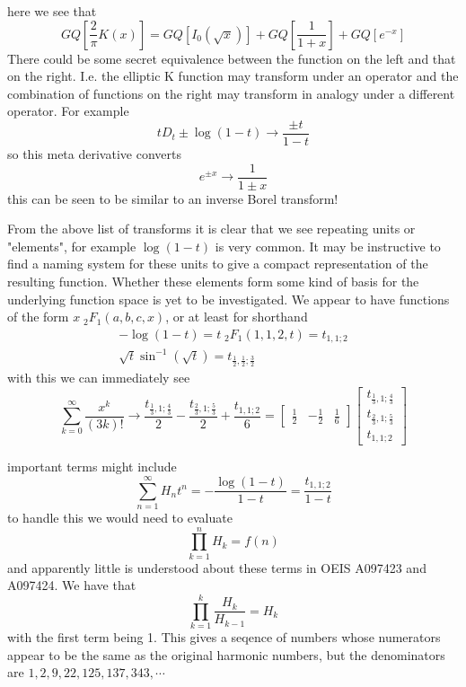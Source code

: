 \documentclass{article}
\begin{document}
here we see that
$$
GQ\left[ \frac{2}{\pi} K(x)\right] = GQ\left[I_0(\sqrt{x})\right] + GQ\left[\frac{1}{1+x}\right] + G Q[e^{-x}]
$$
There could be some secret equivalence between the function on the left and that on the right. I.e. the elliptic K function may transform under an operator and the combination of functions on the right may transform in analogy under a different operator. For example
$$
tD_t \pm \log(1-t) \to \frac{\pm t}{1-t}
$$
so this meta derivative converts 
$$
e^{\pm x} \to \frac{1}{1\pm x}
$$
this can be seen to be similar to an inverse Borel transform!

From the above list of transforms it is clear that we see repeating units or "elements", for example $\log(1-t)$ is very common. It may be instructive to find a naming system for these units to give a compact representation of the resulting function. Whether these elements form some kind of basis for the underlying function space is yet to be investigated. We appear to have functions of the form $x \;_2F_1(a,b,c,x)$, or at least for shorthand
\begin{align}
-\log(1-t) = t\;_2F_1(1,1,2,t) = t_{1,1;2} \\
\sqrt{t} \sin^{-1}(\sqrt{t}) = t_{\frac{1}{2},\frac{1}{2};\frac{3}{2}}
\end{align}
with this we can immediately see 
$$
\sum_{k=0}^\infty \frac{x^k}{(3k)!} \to  \frac{t_{\frac{1}{3},1;\frac{4}{3}}}{2}-\frac{t_{\frac{2}{3},1;\frac{5}{3}}}{2}+\frac{t_{1,1;2}}{6} = 
\begin{bmatrix} \frac{1}{2} & -\frac{1}{2} & \frac{1}{6} \end{bmatrix} 
\begin{bmatrix} t_{\frac{1}{3},1;\frac{4}{3}} \\ t_{\frac{2}{3},1;\frac{5}{3}} \\ t_{1,1;2} \end{bmatrix}
$$

important terms might include
$$
\sum_{n=1}^\infty H_n t^n = -\frac{\log(1-t)}{1-t} = \frac{t_{1,1;2}}{1-t}
$$
to handle this we would need to evaluate 
$$
\prod_{k=1}^n H_k = f(n)
$$
and apparently little is understood about these terms in OEIS A097423 and A097424.
We have that 
$$
\prod_{k=1}^k \frac{H_k}{H_{k-1}} = H_k
$$
with the first term being 1. This gives a seqence of numbers whose numerators appear to be the same as the original harmonic numbers, but the denominators are $1,2,9,22,125,137,343,\cdots$
\end{document}
